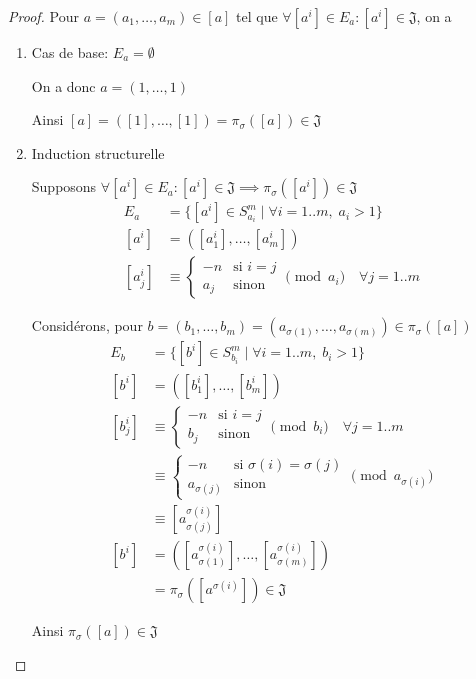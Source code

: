 \documentclass{article}
\begin{document}
\begin{proof}
    Pour $a = (a_1, \dots, a_m) \in [a]$ tel que $\forall [a^i] \in E_a : [a^i] \in \mathfrak{J}$, on a

    \begin{enumerate}
    \item Cas de base: $E_a = \emptyset$

        On a donc $a = (1, \dots, 1)$

        Ainsi $[a] = ([1], \dots, [1]) = \pi_{\sigma}([a]) \in \mathfrak{J}$

    \item Induction structurelle

        Supposons $\forall [a^i] \in E_a : [a^i] \in \mathfrak{J} \implies \pi_{\sigma}([a^i]) \in \mathfrak{J}$
        \begin{align*}
            E_a & = \{ [a^i] \in S_{a_i}^m \mid \forall i = 1..m,\; a_i > 1 \} \\
            [a^i] & = ([a_1^i], \dots, [a_m^i]) \\
            [a_j^i] &\equiv \begin{cases}
                    -n &\text{si } i = j \\
                    a_j &\text{sinon}
                \end{cases} \pmod{a_i} \quad \forall j = 1..m
        \end{align*}

        Considérons, pour $b = (b_1, \dots, b_m) = (a_{\sigma(1)}, \dots, a_{\sigma(m)}) \in \pi_{\sigma}([a])$
        \begin{align*}
            E_b & = \{ [b^i] \in S_{b_i}^m \mid \forall i = 1..m,\; b_i > 1 \} \\
            [b^i] & = ([b_1^i], \dots, [b_m^i]) \\
            [b_j^i] & \equiv \begin{cases}
                    -n &\text{si } i = j \\
                    b_j &\text{sinon}
                \end{cases} \pmod{b_i} \quad \forall j = 1..m \\
                & \equiv \begin{cases}
                    -n &\text{si } \sigma(i) = \sigma(j) \\
                    a_{\sigma(j)} &\text{sinon}
                \end{cases} \pmod {a_{\sigma(i)}} \\
                & \equiv [a_{\sigma(j)}^{\sigma(i)}] \\
            [b^i] & = ([a_{\sigma(1)}^{\sigma(i)}], \dots, [a_{\sigma(m)}^{\sigma(i)}]) \\
                & = \pi_{\sigma}([a^{\sigma(i)}]) \in \mathfrak{J}
        \end{align*}

        Ainsi $\pi_{\sigma}([a]) \in \mathfrak{J}$
    \end{enumerate}
\end{proof}
\end{document}
